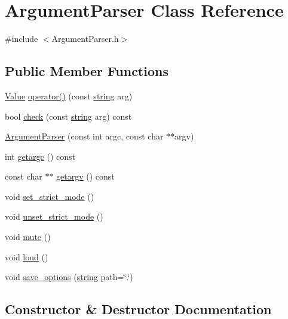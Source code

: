 \hypertarget{class_argument_parser}{}\section{Argument\+Parser Class Reference}
\label{class_argument_parser}


{\ttfamily \#include $<$Argument\+Parser.\+h$>$}

\subsection*{Public Member Functions}
\begin{DoxyCompactItemize}
\item 
\hyperlink{class_value}{Value} \hyperlink{class_argument_parser_acca583e2f4ed0d0eea39df89e03977ee}{operator()} (const \hyperlink{testfpzip_8cpp_a984bb8e04129c4268bd6ff36a50c9fa4}{string} arg)
\item 
bool \hyperlink{class_argument_parser_adf986abe5c47699a651ee939e198407d}{check} (const \hyperlink{testfpzip_8cpp_a984bb8e04129c4268bd6ff36a50c9fa4}{string} arg) const 
\item 
\hyperlink{class_argument_parser_a1355ae6f318c765d406d4ea600d2ea62}{Argument\+Parser} (const int argc, const char $\ast$$\ast$argv)
\item 
int \hyperlink{class_argument_parser_a778f72cb66634cea1a93446c4a0bc428}{getargc} () const 
\item 
const char $\ast$$\ast$ \hyperlink{class_argument_parser_aa20c2b84e7f77cfd65e315b8291fe342}{getargv} () const 
\item 
void \hyperlink{class_argument_parser_af30fc2364f2e0cf72e9ce17bf30fd645}{set\+\_\+strict\+\_\+mode} ()
\item 
void \hyperlink{class_argument_parser_a47b9bd39a2587221398c6785560072f8}{unset\+\_\+strict\+\_\+mode} ()
\item 
void \hyperlink{class_argument_parser_a6aaf4cd8c288d4de96aefdd5299a4f59}{mute} ()
\item 
void \hyperlink{class_argument_parser_acafcfe7dfe91ced9a020a65979bf03d9}{loud} ()
\item 
void \hyperlink{class_argument_parser_a10793f42b5c6bbb358d2929b2dc09c0f}{save\+\_\+options} (\hyperlink{testfpzip_8cpp_a984bb8e04129c4268bd6ff36a50c9fa4}{string} path=\char`\"{}.\char`\"{})
\end{DoxyCompactItemize}


\subsection{Constructor \& Destructor Documentation}
\hypertarget{class_argument_parser_a1355ae6f318c765d406d4ea600d2ea62}{}
